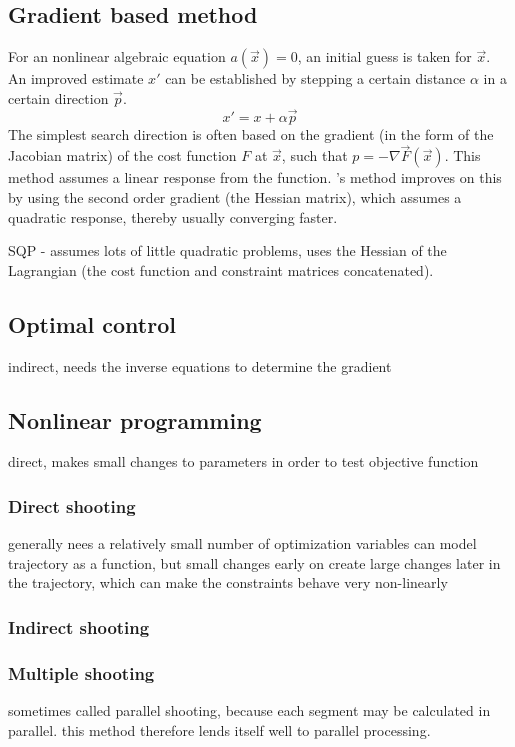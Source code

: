 \subsection{Gradient based method}
For an nonlinear algebraic equation $a(\vec{x})=0$, an initial guess is taken for $\vec{x}$. An improved estimate $x'$ can be established by stepping a certain distance $\alpha$ in a certain direction $\vec{p}$.
\begin{equation}
x'=x+\alpha\vec{p}
\end{equation}
The simplest search direction is often based on the gradient (in the form of the Jacobian matrix) of the cost function $F$ at $\vec{x}$, such that $p=-\nabla\vec{F}(\vec{x})$. This method assumes a linear response from the function. \textcite{Newton1711}'s method improves on this by using the second order gradient (the Hessian matrix), which assumes a quadratic response, thereby usually converging faster.

SQP - assumes lots of little quadratic problems, uses the Hessian of the Lagrangian (the cost function and constraint matrices concatenated).

\subsection{Optimal control}
indirect, needs the inverse equations to determine the gradient

\subsection{Nonlinear programming}
direct, makes small changes to parameters in order to test objective function
\subsubsection{Direct shooting}
generally nees a relatively small number of optimization variables
can model trajectory as a function, but small changes early on create large changes later in the trajectory, which can make the constraints behave very non-linearly \cite{Betts1998}
\subsubsection{Indirect shooting}
\subsubsection{Multiple shooting}
sometimes called parallel shooting, because each segment may be calculated in parallel. this method therefore lends itself well to parallel processing.
